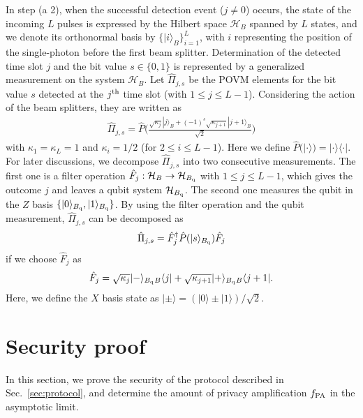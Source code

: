\documentclass[prl,twocolumn,superscriptaddress,nofootinbib]{revtex4}
\def\U#1{{\rm #1}}
\newcommand{\bra}[1]{\langle #1 |}
\newcommand{\ket}[1]{| #1 \rangle}
\begin{document}
  In step (a 2),
  when the successful detection event ($j\neq0$) occurs, the state of the incoming $L$ pulses is expressed by the
  Hilbert space $\mathcal{H}_B$ 
  spanned by $L$ states, and we denote its orthonormal basis by $\{\ket{i}_B\}^L_{i=1}$,
  with $i$ representing the position of the single-photon before the first beam splitter. 
  Determination of the detected time slot $j$ and the bit value $s\in\{0,1\}$ is represented by a generalized measurement
  on the system $\mathcal{H}_B$.
  Let $\hat{\Pi}_{j,s}$ be the POVM elements for the bit value $s$ detected at the $j^{\U{th}}$ time slot (with $1\leq j\leq L-1$).
  Considering the action of the beam splitters, they are written as
  \begin{align}
    \hat{\Pi}_{j,s}=\hat{P}\Big(\frac{\sqrt{\kappa_j}\ket{j}_B+(-1)^s\sqrt{\kappa_{j+1}}\ket{j+1}_B}{\sqrt{2}}\Big)
    \label{bobpovm}
  \end{align}
  with $\kappa_1=\kappa_L=1$ and $\kappa_i=1/2$ (for $2\leq i\leq L-1$).
  Here we define $\hat{P}(\ket{\cdot})=\ket{\cdot}\bra{\cdot}$.
  For later discussions, we decompose $\hat{\Pi}_{j,s}$ into two consecutive measurements.
  The first one is a filter operation $\hat{F}_j:\mathcal{H}_B\to \mathcal{H}_{B_{\U{q}}}$ with $1\leq j\leq L-1$,
  which gives the outcome $j$ and leaves a qubit system $\mathcal{H}_{B_{\U{q}}}$.
  The second one measures the qubit in the $Z$ basis $\{\ket{0}_{B_{\U{q}}},\ket{1}_{B_{\U{q}}}\}$.
  By using the filter operation and the qubit measurement, $\hat{\Pi}_{j,s}$ can be decomposed as
\begin{align}
  \hat{\Pi}_{j,s}=\hat{F}^{\dagger}_{j}\hat{P}(\ket{s}_{B_{\U{q}}})\hat{F}_{j}
  \label{PiFsF}
  \end{align}
if we choose $\hat{F}_j$ as
\begin{align}
  \hat{F}_j=\sqrt{\kappa_j}\ket{-}_{B_{\U{q}}}{}_B\bra{j}+\sqrt{\kappa_{j+1}}\ket{+}_{B_{\U{q}}}{}_B\bra{j+1}.
  \label{filter}
\end{align}
Here, we define the $X$ basis state as $\ket{\pm}=(\ket{0}\pm\ket{1})/\sqrt{2}$. 
  
  
  
\section{Security proof}
\label{sec:security}
            In this section, we prove the security of the protocol described in Sec.~\ref{sec:protocol},
            and determine the amount of privacy amplification $f_{\U{PA}}$ in the asymptotic limit.
\end{document}
